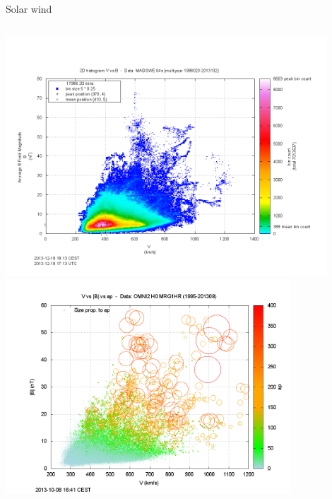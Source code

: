 \begin{frame}[plain,c]{Solar wind}{}
	\begin{columns}[c]
		
		\includegraphics[width=0.9\textwidth]{../talk_figures/2Dhistogram_VB_5x025_plot.png}\\
		\includegraphics[width=0.8\textwidth]{../talk_figures/V_vs_B_vs_ap_plot.png}

		

\end{columns}
\end{frame}
